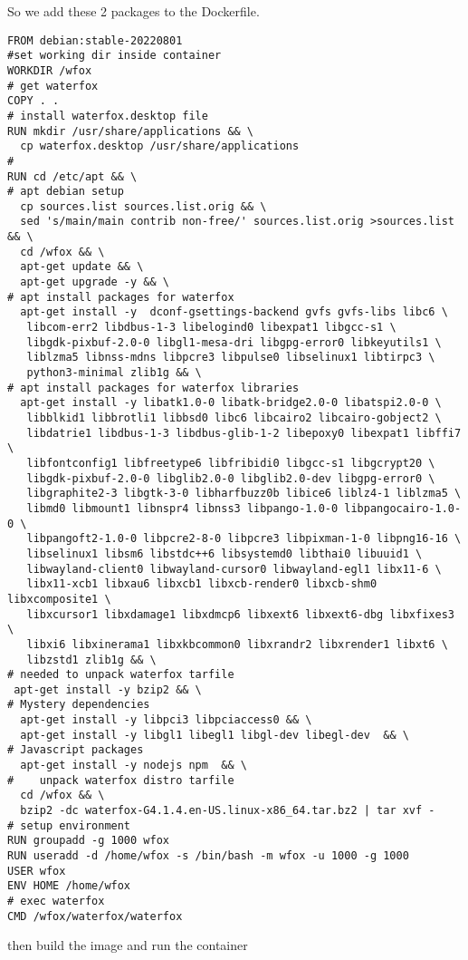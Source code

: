 \documentclass[a4paper]{article}  %
\begin{document}
So we add these 2 packages to the Dockerfile.
\begin{tcolorbox}
\begin{verbatim}
FROM debian:stable-20220801
#set working dir inside container
WORKDIR /wfox
# get waterfox
COPY . .
# install waterfox.desktop file
RUN mkdir /usr/share/applications && \
  cp waterfox.desktop /usr/share/applications
#
RUN cd /etc/apt && \
# apt debian setup
  cp sources.list sources.list.orig && \
  sed 's/main/main contrib non-free/' sources.list.orig >sources.list && \
  cd /wfox && \
  apt-get update && \
  apt-get upgrade -y && \
# apt install packages for waterfox
  apt-get install -y  dconf-gsettings-backend gvfs gvfs-libs libc6 \
   libcom-err2 libdbus-1-3 libelogind0 libexpat1 libgcc-s1 \
   libgdk-pixbuf-2.0-0 libgl1-mesa-dri libgpg-error0 libkeyutils1 \
   liblzma5 libnss-mdns libpcre3 libpulse0 libselinux1 libtirpc3 \
   python3-minimal zlib1g && \
# apt install packages for waterfox libraries
  apt-get install -y libatk1.0-0 libatk-bridge2.0-0 libatspi2.0-0 \
   libblkid1 libbrotli1 libbsd0 libc6 libcairo2 libcairo-gobject2 \
   libdatrie1 libdbus-1-3 libdbus-glib-1-2 libepoxy0 libexpat1 libffi7 \
   libfontconfig1 libfreetype6 libfribidi0 libgcc-s1 libgcrypt20 \
   libgdk-pixbuf-2.0-0 libglib2.0-0 libglib2.0-dev libgpg-error0 \
   libgraphite2-3 libgtk-3-0 libharfbuzz0b libice6 liblz4-1 liblzma5 \
   libmd0 libmount1 libnspr4 libnss3 libpango-1.0-0 libpangocairo-1.0-0 \
   libpangoft2-1.0-0 libpcre2-8-0 libpcre3 libpixman-1-0 libpng16-16 \
   libselinux1 libsm6 libstdc++6 libsystemd0 libthai0 libuuid1 \
   libwayland-client0 libwayland-cursor0 libwayland-egl1 libx11-6 \
   libx11-xcb1 libxau6 libxcb1 libxcb-render0 libxcb-shm0 libxcomposite1 \
   libxcursor1 libxdamage1 libxdmcp6 libxext6 libxext6-dbg libxfixes3 \
   libxi6 libxinerama1 libxkbcommon0 libxrandr2 libxrender1 libxt6 \
   libzstd1 zlib1g && \
# needed to unpack waterfox tarfile
 apt-get install -y bzip2 && \
# Mystery dependencies
  apt-get install -y libpci3 libpciaccess0 && \
  apt-get install -y libgl1 libegl1 libgl-dev libegl-dev  && \
# Javascript packages
  apt-get install -y nodejs npm  && \
#    unpack waterfox distro tarfile
  cd /wfox && \
  bzip2 -dc waterfox-G4.1.4.en-US.linux-x86_64.tar.bz2 | tar xvf -
# setup environment
RUN groupadd -g 1000 wfox
RUN useradd -d /home/wfox -s /bin/bash -m wfox -u 1000 -g 1000
USER wfox
ENV HOME /home/wfox
# exec waterfox
CMD /wfox/waterfox/waterfox
\end{verbatim}
\end{tcolorbox}
then build the image and run the container
\end{document}
